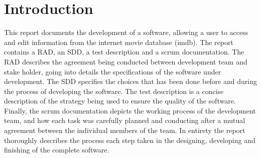 \chapter{Introduction}

This report documents the development of a software, allowing a user to access and edit information from the internet movie database (imdb).
The report contains a RAD, an SDD, a test description and a scrum documentation.
The RAD describes the agreement being conducted between development team and stake holder, going into details the specifications of the software under development.
The SDD specifies the choices that has been done before and during the process of developing the software.
The test description is a concise description of the strategy being used to ensure the quality of the software.
Finally, the scrum documentation depicts the working process of the development team, and how each task was carefully planned and conducting after a mutual agreement between the individual members of the team.
In entirety the report thoroughly describes the process each step taken in the designing, developing and finishing of the complete software.

